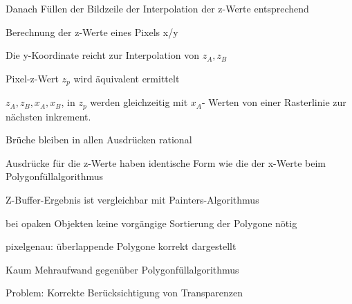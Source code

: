 \documentclass[landscape]{article}
\begin{document}
\begin{multicols}{3}
\begin{itemize*}
\begin{itemize*}
      \item Danach Füllen der Bildzeile der Interpolation der z-Werte entsprechend
    \end{itemize*}
    \item Berechnung der z-Werte eines Pixels x/y
    \begin{itemize*}
      \item Die y-Koordinate reicht zur Interpolation von $z_A,z_B$
      \item Pixel-z-Wert $z_p$ wird äquivalent ermittelt
      \item $z_A, z_B, x_A, x_B$, in $z_p$ werden gleichzeitig mit $x_A$- Werten von einer Rasterlinie zur nächsten inkrement.
      \item Brüche bleiben in allen Ausdrücken rational
      \item Ausdrücke für die z-Werte haben identische Form wie die der x-Werte beim Polygonfüllalgorithmus
    \end{itemize*}
    \item Z-Buffer-Ergebnis ist vergleichbar mit Painters-Algorithmus
    \item bei opaken Objekten keine vorgängige Sortierung der Polygone nötig
    \item pixelgenau: überlappende Polygone korrekt dargestellt
    \item Kaum Mehraufwand gegenüber Polygonfüllalgorithmus
    \item Problem: Korrekte Berücksichtigung von Transparenzen
  \end{itemize*}
  

\end{multicols}
\end{document}
